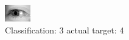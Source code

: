\begin{figure}[h!]
\begin{center}
\includegraphics[width=0.60\columnwidth]{figures/ID3232_class_3_target_4.png}
\end{center}
\caption{ Classification: 3 actual target: 4}
\label{fig:ID3232_class_3_target_4}
\end{figure}
